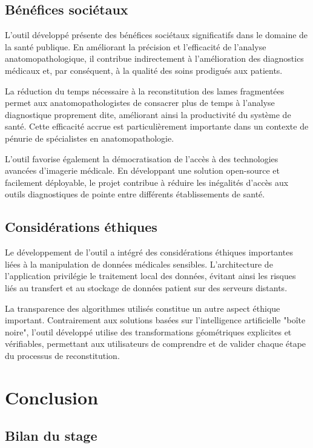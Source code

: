 \documentclass[12pt,a4paper]{report}
\begin{document}
\section{Bénéfices sociétaux}

L'outil développé présente des bénéfices sociétaux significatifs dans le domaine de la santé publique. En améliorant la précision et l'efficacité de l'analyse anatomopathologique, il contribue indirectement à l'amélioration des diagnostics médicaux et, par conséquent, à la qualité des soins prodigués aux patients.

La réduction du temps nécessaire à la reconstitution des lames fragmentées permet aux anatomopathologistes de consacrer plus de temps à l'analyse diagnostique proprement dite, améliorant ainsi la productivité du système de santé. Cette efficacité accrue est particulièrement importante dans un contexte de pénurie de spécialistes en anatomopathologie.

L'outil favorise également la démocratisation de l'accès à des technologies avancées d'imagerie médicale. En développant une solution open-source et facilement déployable, le projet contribue à réduire les inégalités d'accès aux outils diagnostiques de pointe entre différents établissements de santé.

\section{Considérations éthiques}

Le développement de l'outil a intégré des considérations éthiques importantes liées à la manipulation de données médicales sensibles. L'architecture de l'application privilégie le traitement local des données, évitant ainsi les risques liés au transfert et au stockage de données patient sur des serveurs distants.

La transparence des algorithmes utilisés constitue un autre aspect éthique important. Contrairement aux solutions basées sur l'intelligence artificielle "boîte noire", l'outil développé utilise des transformations géométriques explicites et vérifiables, permettant aux utilisateurs de comprendre et de valider chaque étape du processus de reconstitution.

\chapter{Conclusion}

\section{Bilan du stage}
\end{document}
